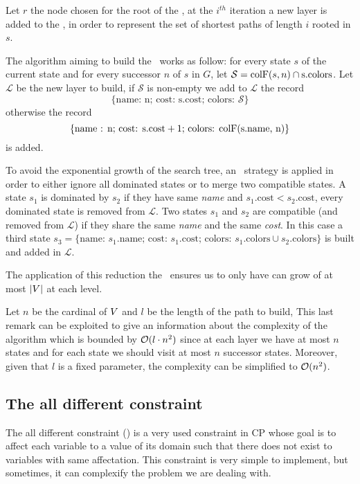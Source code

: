 Let $r$ the node chosen for the root of the \mdd, at the $i^{th}$ iteration a new layer is added to the \mdd, in order to represent the set of shortest paths of length $i$ rooted in $s$.

The algorithm aiming to build the \mdd\ works as follow: for every state $s$ of the current state and for every successor $n$ of $s$ in $G$, let $\mathcal{S} = \text{colF}(s, n) \cap \text{s.colors}$. Let $\mathcal{L}$ be the new layer to build, if $\mathcal{S}$ is non-empty we add to $\mathcal{L}$ the record
$$\{\text{name: n; cost: s.cost; colors: } \mathcal{S}\}$$ otherwise the record
$$\{\text{name : n; cost: s.cost} + 1 \text{; colors: \text{colF}(s.name, n)}\}$$ is added.

To avoid the exponential growth of the search tree, an \adhoc\ strategy is applied in order to either ignore all dominated states or to merge two compatible states. A state $s_1$ is dominated by $s_2$ if they have same \textit{name} and $s_1.\text{cost} < s_2.\text{cost}$, every dominated state is removed from $\mathcal{L}$. Two states $s_1$ and $s_2$ are compatible (and removed from $\mathcal{L}$) if they share the same \textit{name} and the same \textit{cost}. In this case a third state $s_3 = \{\text{name: } s_1.\text{name; cost: } s_1.\text{cost; colors: } s_1.\text{colors} \cup s_2.\text{colors}\}$ is built and added in $\mathcal{L}$.

The application of this reduction the \mdd\ ensures us to only have can grow of at most $|V|$ at each level.

Let $n$ be the cardinal of $V$ and $l$ be the length of the path to build, This last remark can be exploited to give an information about the complexity of the algorithm which is bounded by $\mathcal{O}(l \cdot n^2)$ since at each layer we have at most $n$ states and for each state we should visit at most $n$ successor states. Moreover, given that $l$ is a fixed parameter, the complexity can be simplified to $\mathcal{O}(n^2)$.



\subsection{The all different constraint}

The all different constraint (\alldiff) is a very used constraint in CP whose goal is to affect each variable to a value of its domain such that there does not exist to variables with same affectation. This constraint is very simple to implement, but sometimes, it can complexify the problem we are dealing with.

